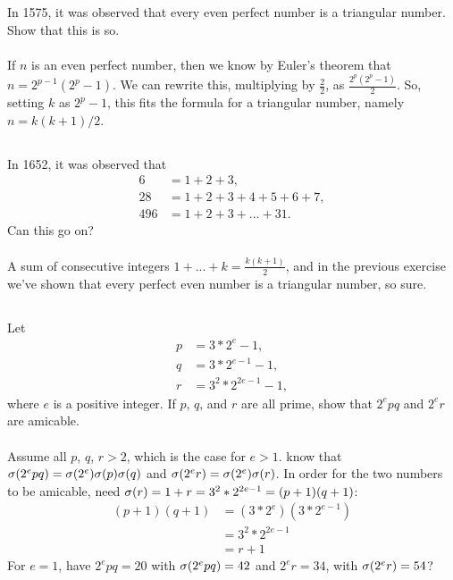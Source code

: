 \documentclass{article}
\begin{document}
\subsection{}
In 1575, it was observed that every even perfect number is a triangular number.
Show that this is so.\\~\\
If $n$ is an even perfect number, then we know by Euler's theorem that
$n = 2^{p - 1}(2^p - 1)$.
We can rewrite this, multiplying by $\frac{2}{2}$, as
$\frac{2^{p}(2^p - 1)}{2}$.
So, setting $k$ as $2^p - 1$, this fits the formula for a triangular number,
namely $n = k(k + 1)/2$.

\subsection{}
In 1652, it was observed that
\begin{align*}
    6 &= 1 + 2 + 3,\\
    28 &= 1 + 2 + 3 + 4 + 5 + 6 + 7,\\
    496 &= 1 + 2 + 3 + ... + 31.
\end{align*}
Can this go on?\\~\\
A sum of consecutive integers $1 + ... + k = \frac{k(k + 1)}{2}$,
and in the previous exercise we've shown that every perfect even number is
a triangular number, so sure.

\subsection{}
Let
\begin{align*}
    p &= 3*2^e - 1,\\
    q &= 3*2^{e - 1} - 1,\\
    r &= 3^2*2^{2e - 1} - 1,
\end{align*}
where $e$ is a positive integer.
If $p$, $q$, and $r$ are all prime, show that $2^epq$ and $2^er$ are amicable.\\~\\
Assume all $p$, $q$, $r > 2$, which is the case for $e > 1$.
know that $\sigma(2^epq) = \sigma(2^e)\sigma(p)\sigma(q)$ and $\sigma(2^er) = \sigma(2^e)\sigma(r)$.
In order for the two numbers to be amicable, need
$\sigma(r) = 1 + r = 3^2*2^{2e - 1} = (p + 1)(q + 1)$:
\begin{align*}
    (p + 1)(q + 1) &= (3*2^e)(3*2^{e - 1})\\
    &= 3^2*2^{2e - 1}\\
    &= r + 1
\end{align*}
For $e = 1$, have $2^epq = 20$ with $\sigma(2^epq) = 42$
and $2^er = 34$, with $\sigma(2^er) = 54$?
\end{document}
